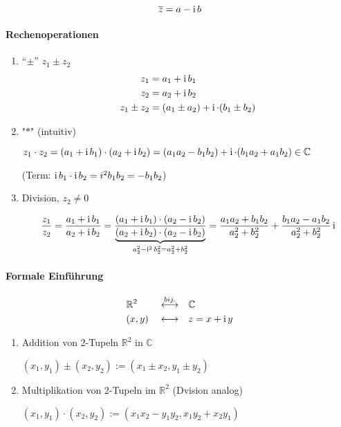 \begin{definition}
 \[ \overline{z} = a - \operatorname{i} b \]
\end{definition}


\paragraph{Rechenoperationen}
\begin{enumerate}

\item ``$\pm$'' $z_1 \pm z_2$
\begin{align*}
z_1 & = a_1 + \operatorname{i} b_1 \\ 
z_2 & = a_2 + \operatorname{i} b_2 \\
z_1 \pm z_2 & = (a_1 \pm a_2) + \operatorname{i} \cdot (b_1 \pm b_2)
\end{align*}

\item "$\ast$" (intuitiv)

$z_1 \cdot z_2 = (a_1 + \operatorname{i} b_1) \cdot (a_2 + \operatorname{i} b_2) = (a_1 a_2 - b_1 b_2) + \operatorname{i} \cdot (b_1 a_2 + a_1 b_2) \in \mathbb{C}$

(Term: $\operatorname{i} b_1 \cdot \operatorname{i} b_2 = i^2 b_1 b_2 = - b_1 b_2$)

\item Division, $z_2 \neq 0$

$$ \frac{z_1}{z_2} = \frac{a_1 + \operatorname{i} b_1}{a_2 + \operatorname{i} b_2} = \frac{(a_1 + \operatorname{i} b_1) \cdot (a_2 - \operatorname{i} b_2)}{\underbrace{(a_2 + \operatorname{i} b_2) \cdot (a_2 - \operatorname{i} b_2)}_{a_2^2 - \operatorname{i}^2 b_2^2 = a_2^2 + b_2^2}} = \frac{a_1 a_2 + b_1 b_2}{a_2^2 + b_2^2} + \frac{b_1 a_2 - a_1 b_2}{a_2^2 + b_2^2} \operatorname{i} $$

\end{enumerate}

\paragraph{Formale Einführung}
\begin{alignat*}{3}
& \mathbb{R}^2 && \overset{bij.}{\longleftrightarrow} && \mathbb{C} \\
& (x, y) && \longleftrightarrow && z = x + \operatorname{i} y
\end{alignat*}
\begin{enumerate}
\item Addition von 2-Tupeln $\mathbb{R}^2$ in $\mathbb{C}$

$(x_1, y_1) \pm (x_2, y_2) := (x_1 \pm x_2, y_1 \pm y_2)$

\item Multiplikation von 2-Tupeln im $\mathbb{R}^2$ (Dvision analog)

$ (x_1, y_1) \cdot (x_2, y_2) := (x_1 x_2 - y_1 y_2, x_1 y_2 + x_2 y_1)$
\end{enumerate}

